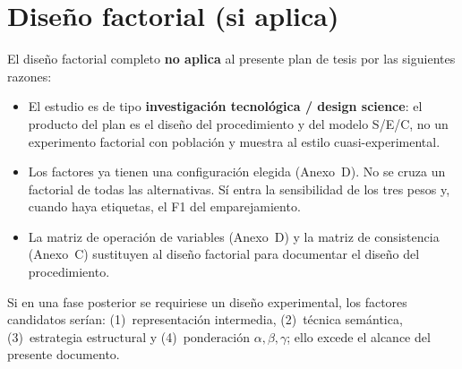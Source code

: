 \chapter{Diseño factorial (si aplica)}
\label{anexo:e}

El diseño factorial completo \textbf{no aplica} al presente plan de tesis por las siguientes
razones:

\begin{itemize}
  \item El estudio es de tipo \textbf{investigación tecnológica / design science}: el producto del
        plan es el diseño del procedimiento y del modelo S/E/C, no un experimento factorial con
        población y muestra al estilo cuasi-experimental.
  \item Los factores ya tienen una configuración elegida (Anexo~D). No se cruza un factorial de
        todas las alternativas. Sí entra la sensibilidad de los tres pesos y, cuando haya
        etiquetas, el F1 del emparejamiento.
  \item La matriz de operación de variables (Anexo~D) y la matriz de consistencia (Anexo~C)
        sustituyen al diseño factorial para documentar el diseño del procedimiento.
\end{itemize}

Si en una fase posterior se requiriese un diseño experimental, los factores candidatos serían:
(1)~representación intermedia, (2)~técnica semántica, (3)~estrategia estructural y
(4)~ponderación $\alpha,\beta,\gamma$; ello excede el alcance del presente documento.
